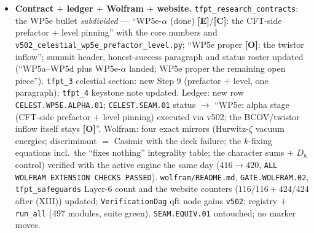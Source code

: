 \documentclass[11pt]{article}
\providecommand{\mE}{\textbf{[E]}}\providecommand{\mC}{\textbf{[C]}}
\providecommand{\mO}{\textbf{[O]}}\providecommand{\mX}{\textbf{[X]}}
\begin{document}
\begin{itemize}[leftmargin=1.5em]
WP5b/WP5c). \mO\ the BCOV/Costello--Li twistor inflow itself (Costello's one-loop axion
$\lambda_g/(8\pi\sqrt3)$ on $\mathbb{PT}$, the Costello--Paquette--Sharma level-from-flux mechanism)
--- v502 anchors the \emph{CFT side} of WP5e only; the KILL branch (``inflow demands a level
$\neq1$'') is not triggered on the CFT side, its twistor side is untested.
\item \textbf{Contract $+$ ledger $+$ Wolfram $+$ website.} \texttt{tfpt\_research\_contracts}: the
WP5e bullet \emph{subdivided} --- ``WP5e-$\alpha$ (done) \mE/\mC: the CFT-side prefactor $+$ level
pinning'' with the core numbers and \texttt{v502\_celestial\_wp5e\_prefactor\_level.py}; ``WP5e
proper \mO: the twistor inflow''; summit header, honest-success paragraph and status roster updated
(``WP5a--WP5d plus WP5e-$\alpha$ landed; WP5e proper the remaining open piece'').
\texttt{tfpt\_3} celestial section: new Step 9 (prefactor $+$ level, one paragraph);
\texttt{tfpt\_4} keystone note updated. Ledger: new row \texttt{CELEST.WP5E.ALPHA.01};
\texttt{CELEST.SEAM.01} status $\to$ ``WP5e: alpha stage (CFT-side prefactor $+$ level pinning)
executed via v502; the BCOV/twistor inflow itself stays \mO''. Wolfram: four exact mirrors
(Hurwitz-$\zeta$ vacuum energies; discriminant $=$ Casimir with the deck failure; the $k$-fixing
equations incl.\ the ``fixes nothing'' integrality table; the character sums $+$ $D_8$ control)
verified with the active engine the same day ($416\to420$, \texttt{ALL WOLFRAM EXTENSION CHECKS
PASSED}). \texttt{wolfram/README.md}, \texttt{GATE.WOLFRAM.02}, \texttt{tfpt\_safeguards} Layer-6
count and the website counters ($116/116+424/424$ after (XIII)) updated; \texttt{VerificationDag}
qft node gains \texttt{v502}; registry $+$ \texttt{run\_all} (497 modules, suite green).
\texttt{SEAM.EQUIV.01} untouched; no marker moves.
\end{itemize}
\end{document}
